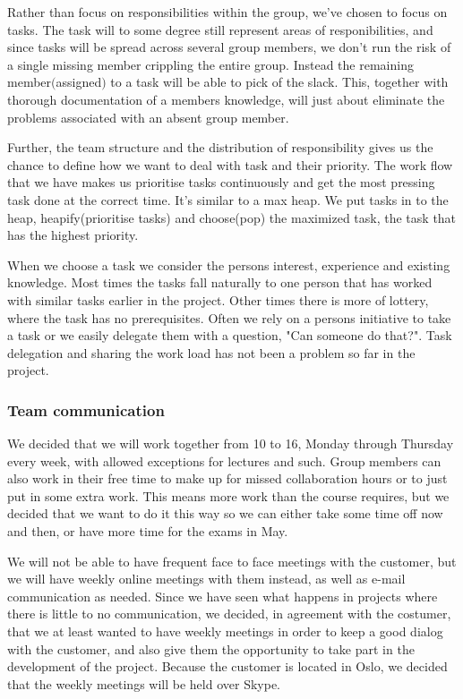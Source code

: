     Rather than focus on responsibilities within the group, we've chosen to focus on tasks.
The task will to some degree still represent areas of responibilities, and since tasks will be spread across several group members, we don't run the risk of  a single missing member crippling the entire group. Instead the remaining member$($assigned$)$ to a task will be able to pick of the slack. This, together with thorough documentation of a members knowledge, will just about eliminate the problems associated with an absent group member.
        
    Further, the team structure and the distribution of responsibility gives us the chance to define how we want to deal with task and their priority. The work flow that we have makes us prioritise tasks continuously and get the most pressing task done at the correct time. It's similar to a max heap. We put tasks in to the heap, heapify(prioritise tasks) and choose(pop) the maximized task, the task that has the highest priority. 
    
    When we choose a task we consider the persons interest, experience and existing knowledge. Most times the tasks fall naturally to one person that has worked with similar tasks earlier in the project. Other times there is more of lottery, where the task has no prerequisites. Often we rely on a persons initiative to take a task or we easily delegate them with a question, "Can someone do that?". Task delegation and sharing the work load has not been a problem so far in the project.
    
    
    \subsubsection{Team communication}\label{Team communication}
    We decided that we will work together from 10 to 16, Monday through Thursday every week, with allowed exceptions for lectures and such. Group members can also work in their free time to make up for missed collaboration hours or to just put in some extra work. This means more work than the course requires, but we decided that we want to do it this way so we can either take some time off now and then, or have more time for the exams in May.

    We will not be able to have frequent face to face meetings with the customer, but we will have weekly online meetings with them instead, as well as e-mail communication as needed. Since we have seen what happens in projects where there is little to no communication, we decided, in agreement with the costumer, that we at least wanted to have weekly meetings in order to keep a good dialog with the customer, and also give them the opportunity to take part in the development of the project. Because the customer is located in Oslo, we decided that the weekly meetings will be held over Skype.
    
